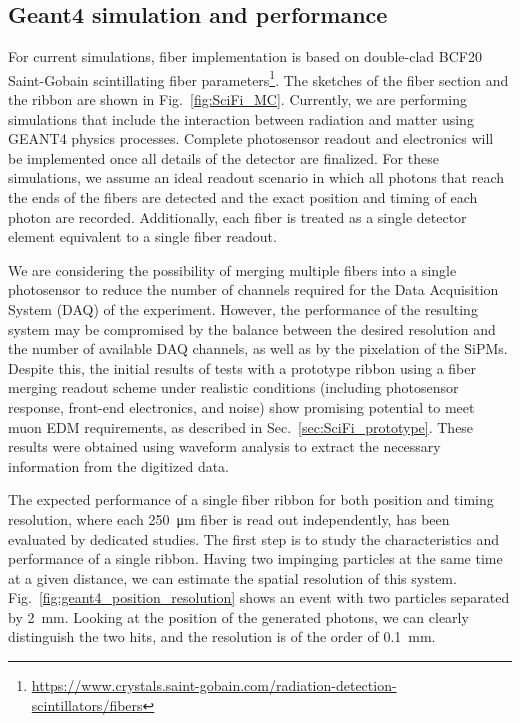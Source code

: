 \begin{refsection}
\subsection{Geant4 simulation and performance}
For current simulations, fiber implementation is based on double-clad BCF20 Saint-Gobain scintillating fiber parameters\footnote{\url{https://www.crystals.saint-gobain.com/radiation-detection-scintillators/fibers}}.
The sketches of the fiber section and the ribbon are shown in Fig.~\ref{fig:SciFi_MC}.
Currently, we are performing simulations that include the interaction between radiation and matter using \textsc{GEANT4} physics processes. Complete photosensor readout and electronics will be implemented once all details of the detector are finalized. 
For these simulations, we assume an ideal readout scenario in which all photons that reach the ends of the fibers are detected and the exact position and timing of each photon are recorded. Additionally, each fiber is treated as a single detector element equivalent to a single fiber readout.

We are considering the possibility of merging multiple fibers into a single photosensor to reduce the number of channels required for the Data Acquisition System (DAQ) of the experiment. 
However, the performance of the resulting system may be compromised by the balance between the desired resolution and the number of available DAQ channels, as well as by the pixelation of the SiPMs. Despite this, the initial results of tests with a prototype ribbon using a fiber merging readout scheme under realistic conditions (including photosensor response, front-end electronics, and noise) show promising potential to meet muon EDM requirements, as described in Sec.~\ref{sec:SciFi_prototype}. These results were obtained using waveform analysis to extract the necessary information from the digitized data.

The expected performance of a single fiber ribbon for both position and timing resolution, where each \SI{250}{\micro m} fiber is read out independently, has been evaluated by dedicated studies. 
The first step is to study the characteristics and performance of a single ribbon. Having two impinging particles at the same time at a given distance, we can estimate the spatial resolution of this system.  Fig.~\ref{fig:geant4_position_resolution} shows an event with two particles separated by \SI{2}{mm}. Looking at the position of the generated photons, we can clearly distinguish the two hits, and the resolution is of the order of \SI{0.1}{mm}.


\end{refsection}
